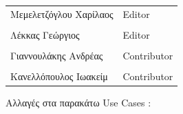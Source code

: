 \documentclass{../ol-softwaremanual}
\begin{document}
	
	\vspace{20pt}
	
	\begin{table}[htbp!]
		\begin{tabular}{ll}
			Μεμελετζόγλου Χαρίλαος & \en Editor \\
			\\ Λέκκας Γεώργιος      &   \en  Editor \\
			\\ Γιαννουλάκης Ανδρέας & \en Contributor \\
			\\ Κανελλόπουλος Ιωακείμ & \en Contributor \\ 
		\end{tabular}
	\end{table}
	
	
	
	\flushleft
	Αλλαγές στα παρακάτω \en Use Cases \gr :
	
\end{document}
